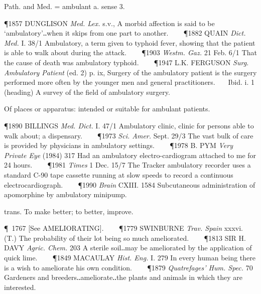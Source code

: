 \begin{description}[wide, labelwidth=!, labelindent=0pt]
\begin{myenumerate}
 Path. and Med. = ambulant a. sense 3. 

\P 1857 DUNGLISON \textit{Med. Lex.} s.v., A morbid affection is said to be ‘ambulatory’‥when it skips from one part to another.    
\P 1882 QUAIN \textit{Dict. Med.} I. 38/1 Ambulatory, a term given to typhoid fever, showing that the patient is able to walk about during the attack.    
\P 1903 \textit{Westm. Gaz.} 21 Feb. 6/1 That the cause of death was ambulatory typhoid.    
\P 1947 L.K. FERGUSON \textit{Surg. Ambulatory Patient} (ed. 2) p. ix, Surgery of the ambulatory patient is the surgery performed more often by the younger men and general practitioners.    Ibid. i. 1 (heading) A survey of the field of ambulatory surgery.
 
 Of places or apparatus: intended or suitable for ambulant patients. 

\P 1890 BILLINGS \textit{Med. Dict.} I. 47/1 Ambulatory clinic, clinic for persons able to walk about; a dispensary.    
\P 1973 \textit{Sci. Amer.} Sept. 29/3 The vast bulk of care is provided by physicians in ambulatory settings.    
\P 1978 B. PYM \textit{Very Private Eye} (1984) 317 Had an ambulatory electro-cardiogram attached to me for 24 hours.    
\P 1981 \textit{Times} 1 Dec. 15/7 The Tracker ambulatory recorder uses a standard C-90 tape cassette running at slow speeds to record a continuous electrocardiograph.    
\P 1990 \textit{Brain} CXIII. 1584 Subcutaneous administration of apomorphine by ambulatory minipump.
\end{myenumerate}


\noindent  {}

\vspace{-0.3cm}

\begin{myenumerate}
 trans. To make better; to better, improve. 

\P 1767 [See AMELIORATING].    
\P 1779 SWINBURNE \textit{Trav. Spain} xxxvi. (T.) The probability of their lot being so much ameliorated.    
\P 1813 SIR H. DAVY \textit{Agric. Chem.} 203 A sterile soil‥may be ameliorated by the application of quick lime.    
\P 1849 MACAULAY \textit{Hist. Eng.} I. 279 In every human being there is a wish to ameliorate his own condition.    
\P 1879 \textit{Quatrefages' Hum. Spec.} 70 Gardeners and breeders‥ameliorate‥the plants and animals in which they are interested.


\end{myenumerate}
\end{description}
